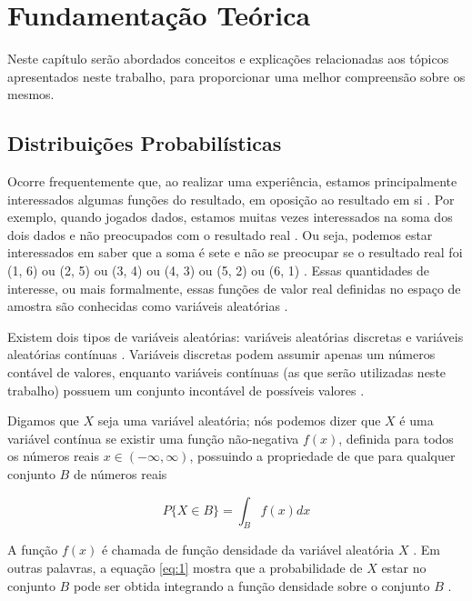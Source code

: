 \setlength\abovedisplayskip{0pt} \setlength\belowdisplayskip{0pt}
\setlength\abovedisplayshortskip{0pt} \setlength\belowdisplayshortskip{0pt}

\chapter{Fundamentação Teórica} \label{cap1}
Neste capítulo serão abordados conceitos e explicações relacionadas aos tópicos apresentados neste trabalho, para proporcionar uma melhor compreensão sobre os mesmos.

\section{Distribuições Probabilísticas}

Ocorre frequentemente que, ao realizar uma experiência, estamos principalmente interessados algumas funções do resultado, em oposição ao resultado em si \cite{ross}. Por exemplo, quando jogados dados, estamos muitas vezes interessados na soma dos dois dados e não preocupados com o resultado real \cite{ross}. Ou seja, podemos estar interessados em saber que a soma é sete e não se preocupar se o resultado real foi (1, 6) ou (2, 5) ou (3, 4) ou (4, 3) ou (5, 2) ou (6, 1) \cite{ross}. Essas quantidades de interesse, ou mais formalmente, essas funções de valor real definidas no espaço de amostra são conhecidas como variáveis aleatórias \cite{ross}.

Existem dois tipos de variáveis aleatórias: variáveis aleatórias discretas e variáveis aleatórias contínuas \cite{ross}. Variáveis discretas podem assumir apenas um números contável de valores, enquanto variáveis contínuas (as que serão utilizadas neste trabalho) possuem um conjunto incontável de possíveis valores \cite{ross}.

Digamos que $X$ seja uma variável aleatória; nós podemos dizer que $X$ é uma variável contínua se existir uma função não-negativa $f(x)$, definida para todos os números reais $x \in (-\infty, \infty)$, possuindo a propriedade de que para qualquer conjunto $B$ de números reais \cite{ross}

\begin{equation}
\label{eq:1}
    P\{X \in B\} = \int_{B} f(x) dx
\end{equation}

A função $f(x)$ é chamada de função densidade da variável aleatória $X$ \cite{ross}. Em outras palavras, a equação \ref{eq:1} mostra que a probabilidade de $X$ estar no conjunto $B$ pode ser obtida integrando a função densidade sobre o conjunto $B$ \cite{ross}.

